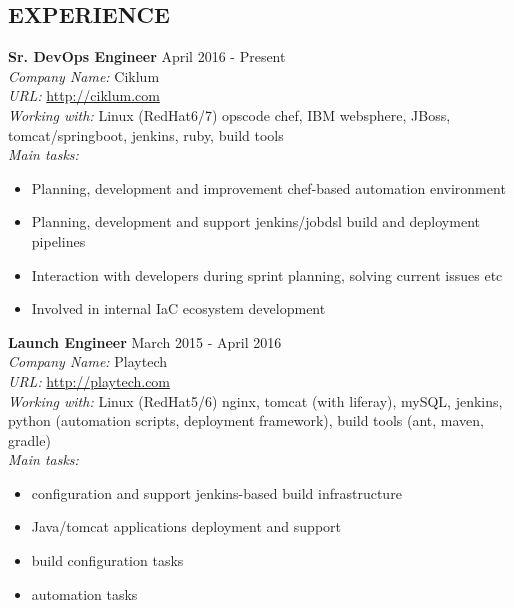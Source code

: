 \documentclass[mymargin,10pt]{res} %
\begin{document}
\begin{resume}
 
\section{EXPERIENCE}

{\bf Sr. DevOps Engineer} \hfill April 2016 - Present \\
{\sl Company Name:} Ciklum \\
{\sl URL:} \url{http://ciklum.com} \\
{\sl Working with:} Linux (RedHat6/7) opscode chef, IBM websphere, JBoss, tomcat/springboot, jenkins, ruby, build tools \\
{\sl Main tasks:}
\begin{itemize}
\item Planning, development and improvement chef-based automation environment
\item Planning, development and support jenkins/jobdsl build and deployment pipelines
\item Interaction with developers during sprint planning, solving current issues etc
\item Involved in internal IaC ecosystem development
\end{itemize}

{\bf Launch Engineer} \hfill March 2015 - April 2016 \\
{\sl Company Name:} Playtech \\
{\sl URL:} \url{http://playtech.com} \\
{\sl Working with:} Linux (RedHat5/6) nginx, tomcat (with liferay), mySQL, jenkins, python (automation scripts, deployment framework), build tools (ant, maven, gradle) \\
{\sl Main tasks:}
\begin{itemize}
\item configuration and support jenkins-based build infrastructure
\item Java/tomcat applications deployment and support
\item build configuration tasks
\item automation tasks
\end{itemize}


\end{resume}
\end{document}
